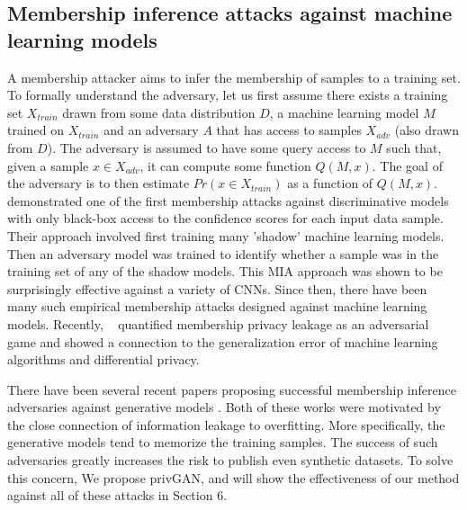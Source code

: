 \documentclass{article}
\begin{document}
\subsection{Membership inference attacks against machine learning models}
A membership attacker aims to infer the membership of samples to a training set. To formally understand the adversary, let us first assume there exists a training set $X_{train}$ drawn from some data distribution $D$, a machine learning model $M$ trained on $X_{train}$ and an adversary $A$ that has access to samples $X_{adv}$ (also drawn from $D$). The adversary is assumed to have some query access to $M$ such that, given a sample $x \in X_{adv}$, it can compute some function $Q(M,x)$. The goal of the adversary is to then estimate $Pr(x \in X_{train})$ as a function of $Q(M,x)$. \cite{shokri2017membership} demonstrated one of the first membership attacks against discriminative models with only black-box access to the confidence scores for each input data sample. Their approach involved first training many 'shadow' machine learning models. Then an adversary model was trained to identify whether a sample was in the training set of any of the shadow models. This MIA approach was shown to be surprisingly effective against a variety of CNNs. Since then, there have been many such empirical membership attacks designed against machine learning models. Recently, ~\cite{yeom2018privacy, jayaraman2020revisiting}  quantified membership privacy leakage as an adversarial game and showed a connection to the generalization error of machine learning algorithms and differential privacy.

There have been several recent papers proposing successful membership inference adversaries against generative models \cite{hayes2019logan,hilprecht2019monte}. Both of these works were motivated by the close connection of information leakage to overfitting. More specifically, the generative models tend to memorize the training samples. The success of such adversaries greatly increases the risk to publish even synthetic datasets. To solve this concern, We propose privGAN, and will show the effectiveness of our method against all of these attacks in Section 6. 
\end{document}
